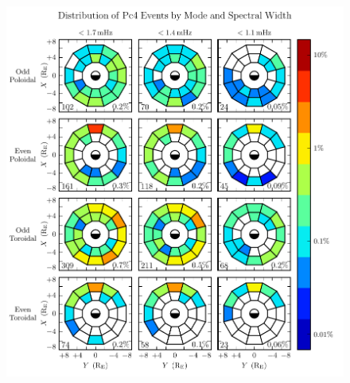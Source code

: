 \begin{figure}[!htb]
    \centering
    \includegraphics[width=\textwidth]{figures/mode_fwhm.pdf}
    \caption[TEST FIGURE]{
      \todo{$\cdots$}
    }
    \label{fig_mode_fwhm}
\end{figure}









